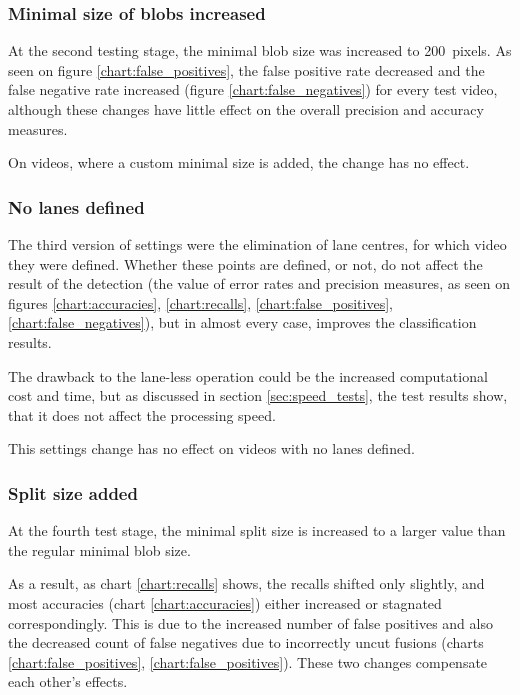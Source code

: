 \subsubsection{Minimal size of blobs increased}\label{sec:ver_2}
At the second testing stage, the minimal blob size was increased to \SI{200}{pixels}.
As seen on figure \ref{chart:false_positives}, the false positive rate decreased and the false negative rate increased (figure \ref{chart:false_negatives}) for every test video, although these changes have little effect on the overall precision and accuracy measures.

On videos, where a custom minimal size is added, the change has no effect.

\subsubsection{No lanes defined}\label{sec:ver_3}
The third version of settings were the elimination of lane centres, for which video they were defined.
Whether these points are defined, or not, do not affect the result of the detection (the value of error rates and precision measures, as seen on figures \ref{chart:accuracies}, \ref{chart:recalls}, \ref{chart:false_positives}, \ref{chart:false_negatives}), but in almost every case, improves the classification results.

The drawback to the lane-less operation could be the increased computational cost and time, but as discussed in section \ref{sec:speed_tests}, the test results show, that it does not affect the processing speed.

This settings change has no effect on videos with no lanes defined.

\subsubsection{Split size added}\label{sec:ver_4}
At the fourth test stage, the minimal split size is increased to a larger value than the regular minimal blob size.

As a result, as chart \ref{chart:recalls} shows, the recalls shifted only slightly, and most accuracies (chart \ref{chart:accuracies}) either increased or stagnated correspondingly.
This is due to the increased number of false positives and also the decreased count of false negatives due to incorrectly uncut fusions (charts \ref{chart:false_positives}, \ref{chart:false_positives}). These two changes compensate each other's effects.

